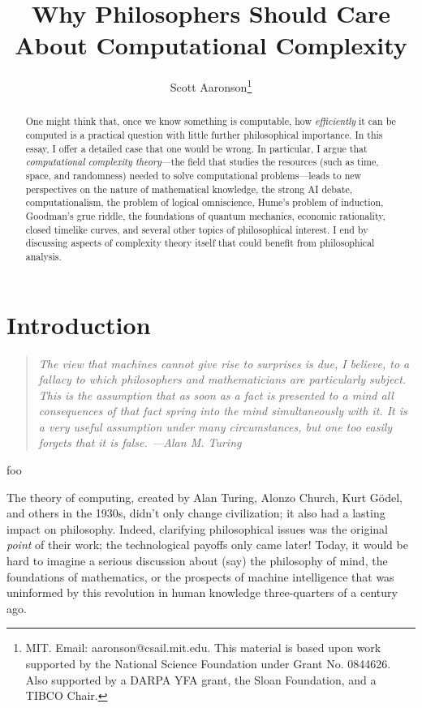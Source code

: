 \documentclass[12pt,onecolumn]{article}%
\begin{document}
\title{Why Philosophers Should Care About Computational Complexity}
\author{Scott Aaronson\thanks{MIT. Email: aaronson@csail.mit.edu. This material
is based upon work supported by the National Science Foundation under Grant
No. 0844626. Also supported by a DARPA YFA grant, the Sloan Foundation, and
a TIBCO Chair.}}
\date{}
\maketitle

\begin{abstract}
One might think that, once we know something is computable, how
\textit{efficiently} it can be computed is a practical question with little
further philosophical importance. In this essay, I offer a detailed case
that one would be wrong. In particular, I argue that \textit{computational
complexity theory}---the field that studies the resources (such as time,
space, and randomness) needed to solve computational problems---leads to new
perspectives on the nature of mathematical knowledge, the strong AI debate,
computationalism, the problem of logical omniscience, Hume's problem of
induction, Goodman's grue riddle, the foundations of quantum mechanics,
economic rationality, closed timelike curves, and several other topics of
philosophical interest. I end by discussing aspects of complexity theory
itself that could benefit from philosophical analysis.

\end{abstract}
\tableofcontents

\newpage
\section{Introduction\label{INTRO}}

\begin{quotation}
\noindent\textit{The view that machines cannot give rise to surprises is due,
I believe, to a fallacy to which philosophers and mathematicians are
particularly subject. This is the assumption that as soon as a fact is
presented to a mind all consequences of that fact spring into the mind
simultaneously with it. It is a very useful assumption under many
circumstances, but one too easily forgets that it is false. ---Alan M. Turing
\cite{turing:ai}}
\end{quotation}

{\sf foo}

The theory of computing, created by Alan Turing, Alonzo Church, Kurt
G\"{o}del, and others in the 1930s, didn't only change civilization; it also
had a lasting impact on philosophy. Indeed, clarifying philosophical issues
was the original \textit{point} of their work; the technological payoffs only
came later! Today, it would be hard to imagine a serious discussion about
(say) the philosophy of mind, the foundations of mathematics, or the prospects
of machine intelligence that was uninformed by this revolution in human
knowledge three-quarters of a century ago.
\end{document}
